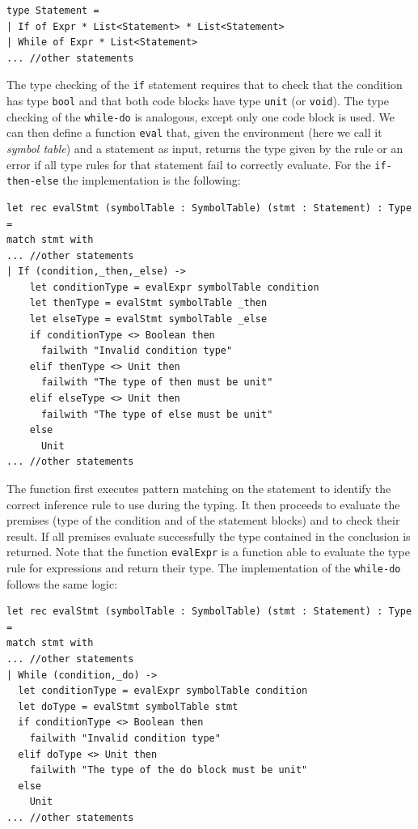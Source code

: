 \begin{lstlisting}
type Statement =
| If of Expr * List<Statement> * List<Statement>
| While of Expr * List<Statement>
... //other statements
\end{lstlisting}

The type checking of the \texttt{if} statement requires that to check that the condition has type \texttt{bool} and that both code blocks have type \texttt{unit} (or \texttt{void}). The type checking of the \texttt{while-do} is analogous, except only one code block is used. We can then define a function \texttt{eval} that, given the environment (here we call it \textit{symbol table}) and a statement as input, returns the type given by the rule or an error if all type rules for that statement fail to correctly evaluate. For the 
\texttt{if-then-else} the implementation is the following:

\begin{lstlisting}
let rec evalStmt (symbolTable : SymbolTable) (stmt : Statement) : Type =
match stmt with
... //other statements
| If (condition,_then,_else) ->
    let conditionType = evalExpr symbolTable condition
    let thenType = evalStmt symbolTable _then
    let elseType = evalStmt symbolTable _else
    if conditionType <> Boolean then
      failwith "Invalid condition type"
    elif thenType <> Unit then
      failwith "The type of then must be unit"
    elif elseType <> Unit then
      failwith "The type of else must be unit"
    else
      Unit
... //other statements
\end{lstlisting}

\noindent
The function first executes pattern matching on the statement to identify the correct inference rule to use during the typing. It then proceeds to evaluate the premises (type of the condition and of the statement blocks) and to check their result. If all premises evaluate successfully the type contained in the conclusion is returned. Note that the function \texttt{evalExpr} is a function able to evaluate the type rule for expressions and return their type. 
The implementation of the \texttt{while-do} follows the same logic:

\begin{lstlisting}
let rec evalStmt (symbolTable : SymbolTable) (stmt : Statement) : Type =
match stmt with
... //other statements
| While (condition,_do) ->
  let conditionType = evalExpr symbolTable condition
  let doType = evalStmt symbolTable stmt
  if conditionType <> Boolean then
    failwith "Invalid condition type"
  elif doType <> Unit then
    failwith "The type of the do block must be unit"
  else
    Unit
... //other statements
\end{lstlisting}


